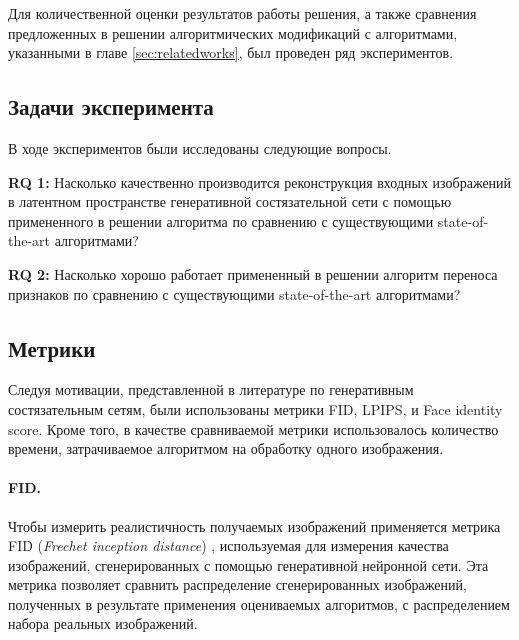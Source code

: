 
Для количественной оценки результатов работы решения, а также сравнения предложенных в решении алгоритмических модификаций с алгоритмами, указанными в главе \ref{sec:relatedworks}, был проведен ряд экспериментов.


\subsection{Задачи эксперимента}
В ходе экспериментов были исследованы следующие вопросы.

\textbf{RQ 1: } Насколько качественно производится реконструкция входных изображений в латентном пространстве генеративной состязательной сети с помощью примененного в решении алгоритма по сравнению с существующими state-of-the-art алгоритмами?

\textbf{RQ 2: }Насколько хорошо работает примененный в решении алгоритм переноса признаков по сравнению с существующими state-of-the-art алгоритмами?



\subsection{Метрики}
Следуя мотивации, представленной в литературе по генеративным состязательным сетям, были использованы метрики FID, LPIPS, и Face identity score. Кроме того, в качестве сравниваемой метрики использовалось количество времени, затрачиваемое алгоритмом на обработку одного изображения.

\paragraph{FID.} 
Чтобы измерить реалистичность получаемых изображений применяется метрика FID (\emph{Frechet inception distance}) \cite{heusel2017fid}, используемая для измерения качества изображений, сгенерированных с помощью генеративной нейронной сети.
Эта метрика позволяет сравнить распределение сгенерированных изображений, полученных в результате применения оцениваемых алгоритмов, с распределением набора реальных изображений.

